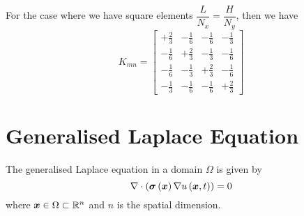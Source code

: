 For the case where we have square elements \ie $\dfrac{L}{N_{x}}=\dfrac{H}{N_{y}}$, then we have
\begin{equation}
  K_{mn}=\begin{bmatrix}
  +\frac{2}{3} & -\frac{1}{6} & -\frac{1}{6} & -\frac{1}{3} \\
  -\frac{1}{6} & +\frac{2}{3} & -\frac{1}{3} & -\frac{1}{6} \\
  -\frac{1}{6} & -\frac{1}{3} & +\frac{2}{3} & -\frac{1}{6} \\
  -\frac{1}{3} & -\frac{1}{6} & -\frac{1}{6} & +\frac{2}{3}
  \end{bmatrix}
  \label{eqn:FEMTwoDLaplaceSquareElementStiffnessMatrix}  
\end{equation}

\section{Generalised Laplace Equation}
\label{sec:ElementStiffnessMatrixGenLaplace}

The generalised Laplace equation in a domain $\Omega$ is given by  \ie
\begin{equation}
  \divergence{}{\pbrac{\fnof{\conductivitytensor}{\vectr{x}}\gradient{}{\fnof{u}{\vectr{x},t}}}}=0
\end{equation}
where $\vectr{x}\in\Omega\subset\rntopology{n}$ and $n$ is the spatial dimension.

